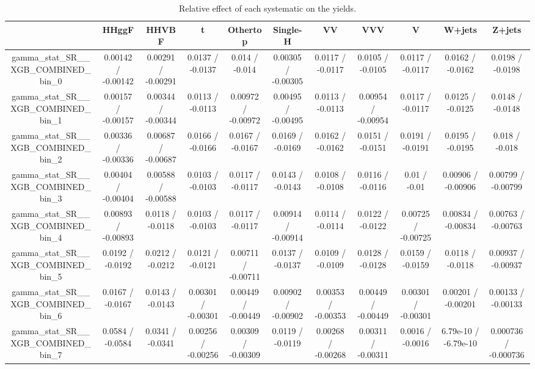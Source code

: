 \documentclass[10pt]{article}
\begin{document}
\begin{table}[htbp]
\begin{center}
\begin{tabular}{|c|c|c|c|c|c|c|c|c|c|c|}
\hline 
      & HHggF      & HHVBF      & t      & Othertop      & Single-H      & VV      & VVV      & V      & W+jets      & Z+jets \\ 
\hline 
  gamma_stat_SR__XGB_COMBINED_bin_0 & 0.00142 / -0.00142 & 0.00291 / -0.00291 & 0.0137 / -0.0137 & 0.014 / -0.014 & 0.00305 / -0.00305 & 0.0117 / -0.0117 & 0.0105 / -0.0105 & 0.0117 / -0.0117 & 0.0162 / -0.0162 & 0.0198 / -0.0198 \\ 
  gamma_stat_SR__XGB_COMBINED_bin_1 & 0.00157 / -0.00157 & 0.00344 / -0.00344 & 0.0113 / -0.0113 & 0.00972 / -0.00972 & 0.00495 / -0.00495 & 0.0113 / -0.0113 & 0.00954 / -0.00954 & 0.0117 / -0.0117 & 0.0125 / -0.0125 & 0.0148 / -0.0148 \\ 
  gamma_stat_SR__XGB_COMBINED_bin_2 & 0.00336 / -0.00336 & 0.00687 / -0.00687 & 0.0166 / -0.0166 & 0.0167 / -0.0167 & 0.0169 / -0.0169 & 0.0162 / -0.0162 & 0.0151 / -0.0151 & 0.0191 / -0.0191 & 0.0195 / -0.0195 & 0.018 / -0.018 \\ 
  gamma_stat_SR__XGB_COMBINED_bin_3 & 0.00404 / -0.00404 & 0.00588 / -0.00588 & 0.0103 / -0.0103 & 0.0117 / -0.0117 & 0.0143 / -0.0143 & 0.0108 / -0.0108 & 0.0116 / -0.0116 & 0.01 / -0.01 & 0.00906 / -0.00906 & 0.00799 / -0.00799 \\ 
  gamma_stat_SR__XGB_COMBINED_bin_4 & 0.00893 / -0.00893 & 0.0118 / -0.0118 & 0.0103 / -0.0103 & 0.0117 / -0.0117 & 0.00914 / -0.00914 & 0.0114 / -0.0114 & 0.0122 / -0.0122 & 0.00725 / -0.00725 & 0.00834 / -0.00834 & 0.00763 / -0.00763 \\ 
  gamma_stat_SR__XGB_COMBINED_bin_5 & 0.0192 / -0.0192 & 0.0212 / -0.0212 & 0.0121 / -0.0121 & 0.00711 / -0.00711 & 0.0137 / -0.0137 & 0.0109 / -0.0109 & 0.0128 / -0.0128 & 0.0159 / -0.0159 & 0.0118 / -0.0118 & 0.00937 / -0.00937 \\ 
  gamma_stat_SR__XGB_COMBINED_bin_6 & 0.0167 / -0.0167 & 0.0143 / -0.0143 & 0.00301 / -0.00301 & 0.00449 / -0.00449 & 0.00902 / -0.00902 & 0.00353 / -0.00353 & 0.00449 / -0.00449 & 0.00301 / -0.00301 & 0.00201 / -0.00201 & 0.00133 / -0.00133 \\ 
  gamma_stat_SR__XGB_COMBINED_bin_7 & 0.0584 / -0.0584 & 0.0341 / -0.0341 & 0.00256 / -0.00256 & 0.00309 / -0.00309 & 0.0119 / -0.0119 & 0.00268 / -0.00268 & 0.00311 / -0.00311 & 0.0016 / -0.0016 & 6.79e-10 / -6.79e-10 & 0.000736 / -0.000736 \\ 
\hline 
\end{tabular} 
\caption{Relative effect of each systematic on the yields.} 
\end{center} 
\end{table} 
\end{document}
